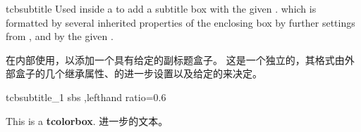 \begin{docCommand}[doc new=2014-10-10]{tcbsubtitle}{}
Used inside a  to add a subtitle box with the given .
which is formatted by several inherited properties of the enclosing box
by further settings from , and by the given .

在内部使用，以添加一个具有给定的副标题盒子。
这是一个独立的，其格式由外部盒子的几个继承属性、的进一步设置以及给定的来决定。

\begin{exdispExample*}{tcbsubtitle_1}{%
sbs%
,lefthand ratio=0.6%
}
\begin{tcolorbox}[title=我的标题,
colback=red!5!white,
colframe=red!75!black,
fonttitle=\bfseries]
  This is a \textbf{tcolorbox}.
进一步的文本。
\end{tcolorbox}
\end{exdispExample*}









\end{docCommand}

